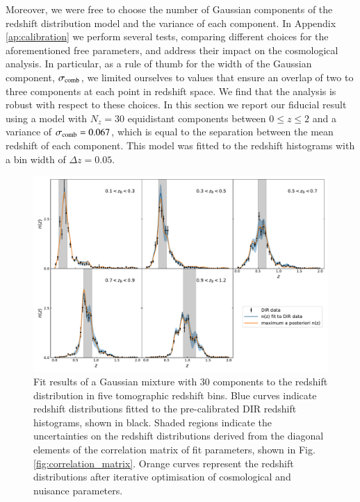 \documentclass{aa}
\begin{document}
Moreover, we were free to choose the number of Gaussian components of the redshift distribution model and the variance of each component. In Appendix \ref{ap:calibration} we perform several tests, comparing different choices for the aforementioned free parameters, and address their impact on the cosmological analysis. In particular, as a rule of thumb for the width of the Gaussian component, $\sigma_{\rm comb}$, we limited ourselves to values that ensure an overlap of two to three components at each point in redshift space. We find that the analysis is robust with respect to these choices. In this section we report our fiducial result using a model with $N_z = 30$ equidistant components between $0\leq z \leq 2$ and a variance of $\sigma_{\rm comb} = 0.067$, which is equal to the separation between the mean redshift of each component. This model was fitted to the redshift histograms with a bin width of $\Delta z = 0.05$.
\begin{figure}
\centering
\includegraphics[width=\linewidth]{optimisation_result.pdf}
\caption{Fit results of a Gaussian mixture with 30 components to the redshift distribution in five tomographic redshift bins. Blue curves indicate redshift distributions fitted to the pre-calibrated DIR redshift histograms, shown in black. Shaded regions indicate the uncertainties on the redshift distributions derived from the diagonal elements of the correlation matrix of fit parameters, shown in Fig. \ref{fig:correlation_matrix}. Orange curves represent the redshift distributions after iterative optimisation of cosmological and nuisance parameters.}
\label{fig:comb}
\end{figure}
\end{document}
